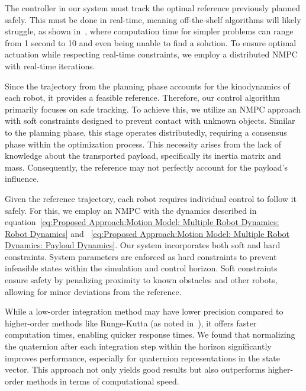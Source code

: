 The controller in our system must track the optimal reference previously planned safely. This must be done in real-time, meaning off-the-shelf algorithms will likely struggle, as shown in~\cite{pardo2016evaluating}, where computation time for simpler problems can range from 1 second to 10 and even being unable to find a solution. To ensure optimal actuation while respecting real-time constraints, we employ a distributed NMPC with real-time iterations.

Since the trajectory from the planning phase accounts for the kinodynamics of each robot, it provides a feasible reference. Therefore, our control algorithm primarily focuses on safe tracking. To achieve this, we utilize an NMPC approach with soft constraints designed to prevent contact with unknown objects. Similar to the planning phase, this stage operates distributedly, requiring a consensus phase within the optimization process. This necessity arises from the lack of knowledge about the transported payload, specifically its inertia matrix and mass. Consequently, the reference may not perfectly account for the payload's influence.

Given the reference trajectory, each robot requires individual control to follow it safely. For this, we employ an NMPC with the dynamics described in equation~\ref{eq:Proposed Approach:Motion Model: Multiple Robot Dynamics: Robot Dynamics} and ~\ref{eq:Proposed Approach:Motion Model: Multiple Robot Dynamics: Payload Dynamics}. Our system incorporates both soft and hard constraints. System parameters are enforced as hard constraints to prevent infeasible states within the simulation and control horizon. Soft constraints ensure safety by penalizing proximity to known obstacles and other robots, allowing for minor deviations from the reference.


While a low-order integration method may have lower precision compared to higher-order methods like Runge-Kutta (as noted in~\cite{gros2020linear}), it offers faster computation times, enabling quicker response times. We found that normalizing the quaternion after each integration step within the horizon significantly improves performance, especially for quaternion representations in the state vector. This approach not only yields good results but also outperforms higher-order methods in terms of computational speed.